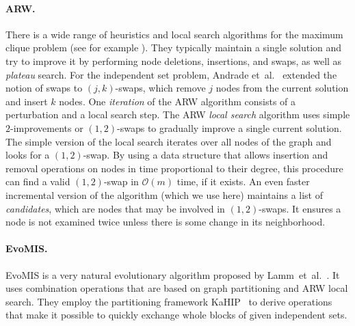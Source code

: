 \documentclass[11pt]{article}
\newcommand{\etal}{et~al.\ }
\begin{document}
\paragraph{ARW.}
There is a wide range of heuristics and local search algorithms for the maximum clique problem (see for example \cite{battiti2001reactive,hansen2004variable,grosso2004combining,katayama2005effective,pullan2006dynamic,grosso2008simple}). 
They typically maintain a single solution and try to improve it by performing node deletions, insertions, and swaps, as well as \emph{plateau} search. 
For the independent set problem, Andrade \etal\cite{AndradeRW12} extended the notion of swaps to $(j,k)$-swaps, which remove $j$ nodes from the current solution and insert $k$ nodes. 
One \emph{iteration} of the ARW algorithm consists of a perturbation and a local search step.
The ARW \emph{local search} algorithm uses simple $2$-improvements or $(1,2)$-swaps to gradually improve a single current solution.  
The simple version of the local search iterates over all nodes of the graph and looks for a $(1,2)$-swap. 
By using a data structure that allows insertion and removal operations on nodes in time proportional to their degree, this procedure can find a valid $(1,2)$-swap in $\mathcal{O}(m)$ time, if it exists.
An even faster incremental version of the algorithm (which we use here) maintains a list of \emph{candidates}, which are nodes that may be involved in $(1,2)$-swaps. 
It ensures a node is not examined twice unless there is some change in its neighborhood.

\paragraph{EvoMIS.}
EvoMIS is a very natural evolutionary algorithm proposed by Lamm~\etal\cite{lammSEA2015}. 
It uses combination operations that are based on graph partitioning and ARW local search.
They employ the partitioning framework KaHIP~\cite{kabapeE} to derive operations that make it possible to quickly exchange whole blocks of given independent sets. 
\end{document}
